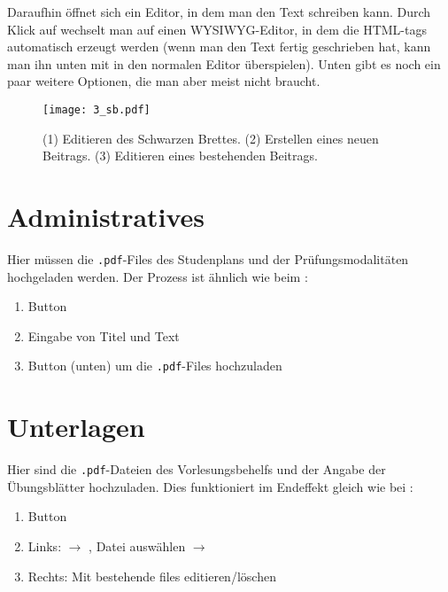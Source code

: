 Daraufhin öffnet sich ein Editor, in dem man den Text schreiben kann. Durch
Klick auf  wechselt man auf einen WYSIWYG\footnotemark[1]
-Editor, in dem die HTML-tags automatisch erzeugt werden (wenn man den Text
fertig geschrieben hat, kann man ihn unten mit  in den
normalen Editor überspielen). Unten gibt es noch ein paar weitere Optionen,
die man aber meist nicht braucht.


\begin{figure}[htbp]
  \texttt{[image: 3\_sb.pdf]}
  \caption{ (1) Editieren des Schwarzen Brettes. (2) Erstellen eines neuen
    Beitrags. (3) Editieren eines bestehenden Beitrags.}
  \label{fig:sb}
\end{figure}

\section{Administratives}

Hier müssen die {\tt .pdf}-Files des Studenplans und der Prüfungsmodalitäten
hochgeladen werden. Der Prozess ist ähnlich wie beim :
\begin{enumerate}
\item Button 
\item Eingabe von Titel und Text
\item Button  (unten) um die {\tt .pdf}-Files hochzuladen
\end{enumerate}


\section{Unterlagen}

Hier sind die {\tt .pdf}-Dateien des Vorlesungsbehelfs und der Angabe der
Übungsblätter hochzuladen. Dies funktioniert im Endeffekt gleich wie bei
:
\begin{enumerate}
\item Button 
\item Links:  $\to$ , Datei auswählen
  $\to$ 
\item Rechts: Mit  bestehende files editieren/löschen
\end{enumerate}


